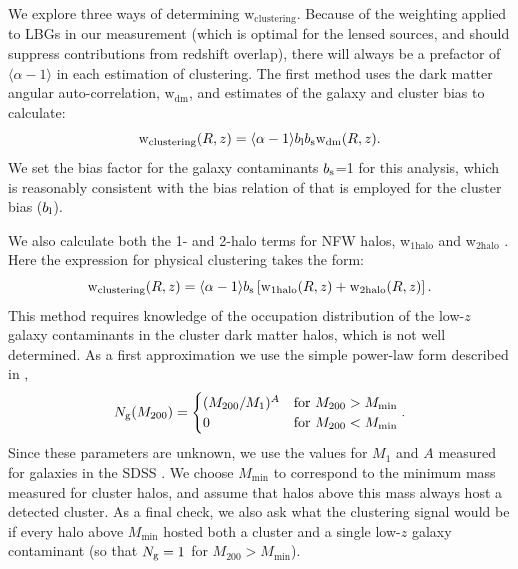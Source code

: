We explore three ways of determining $\mathrm{w}_{\mathrm{clustering}}$. Because of the weighting applied to \ac{LBG}s in our measurement (which is optimal for the lensed sources, and should suppress contributions from redshift overlap), there will always be a prefactor of $\langle \alpha-1 \rangle$ in each estimation of clustering. The first method uses the dark matter angular auto-correlation, $\mathrm{w}_{\mathrm{dm}}$, and estimates of the galaxy and cluster bias to calculate:
\begin{equation}
\mathrm{w}_{\mathrm{clustering}}(R,z) = \langle \alpha-1 \rangle b_{\rm l} b_{\rm s} \mathrm{w}_{\mathrm{dm}}(R,z).
\label{eqn:model13}
\end{equation}
We set the bias factor for the galaxy contaminants $b_{\rm s}$=1 for this analysis, which is reasonably consistent with the bias relation of \citet{Seljak04} that is employed for the cluster bias ($b_{\rm l}$).


We also calculate both the 1- and 2-halo terms for \ac{NFW} halos, w$_{\mathrm{1halo}}$ and w$_{\mathrm{2halo}}$ \citep[again using the code and methods described in][]{Hamana04}. Here the expression for physical clustering takes the form:
\begin{equation}
\mathrm{w}_{\mathrm{clustering}}(R,z) = \langle \alpha-1 \rangle b_{\rm s} \left[\mathrm{w}_{\mathrm{1halo}}(R,z)+\mathrm{w}_{\mathrm{2halo}}(R,z)\right].
\end{equation}
This method requires knowledge of the occupation distribution of the low-$z$ galaxy contaminants in the cluster dark matter halos, which is not well determined. As a first approximation we use the simple power-law form described in \citet{Hamana04},
\begin{equation}
N_{\rm g}(M_{200}) = \begin{cases} (M_{200}/M_1)^A & \text{for $M_{200} > M_{\mathrm{min}}$} \\ 0 & \text{for $ M_{200} < M_{\mathrm{min}}$} \end{cases}.
\end{equation}
Since these parameters are unknown, we use the values for $M_1$ and $A$ measured for galaxies in the \ac{SDSS} \citep[see Table 3 of][]{Zehavi11}. We choose $M_{\mathrm{min}}$ to correspond to the minimum mass measured for cluster halos, and assume that halos above this mass always host a detected cluster. As a final check, we also ask what the clustering signal would be if every halo above $M_{\mathrm{min}}$ hosted both a cluster and a single low-$z$ galaxy contaminant (so that $N_{\rm g} = 1$ for $M_{200} > M_{\mathrm{min}}$).

